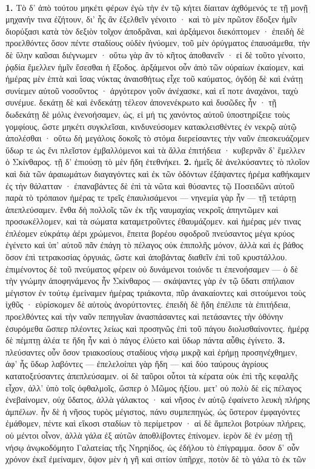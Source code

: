 \documentclass[a4paper, 11pt, oneside, polutonikogreek, german]{article}
\begin{document}
\paragraph{}
\textbf{1.} Τὸ δ' ἀπὸ τούτου μηκέτι φέρων ἐγὼ τὴν ἐν τῷ κήτει δίαιταν ἀχθόμενός τε τῇ μονῇ μηχανήν τινα ἐζήτουν, δι' ἧς ἂν ἐξελθεῖν γένοιτο · καὶ τὸ μὲν πρῶτον ἔδοξεν ἡμῖν διορύξασι κατὰ τὸν δεξιὸν τοῖχον ἀποδρᾶναι, καὶ ἀρξάμενοι διεκόπτομεν · ἐπειδὴ δὲ προελθόντες ὅσον πέντε σταδίους οὐδὲν ἠνύομεν, τοῦ μὲν ὀρύγματος ἐπαυσάμεθα, τὴν δὲ ὕλην καῦσαι διέγνωμεν · οὕτω γὰρ ἂν τὸ κῆτος ἀποθανεῖν · εἰ δὲ τοῦτο γένοιτο, ῥᾳδία ἔμελλεν ἡμῖν ἔσεσθαι ἡ ἔξοδος. ἀρξάμενοι οὖν ἀπὸ τῶν οὐραίων ἐκαίομεν, καὶ ἡμέρας μὲν ἑπτὰ καὶ ἴσας νύκτας ἀναισθήτως εἶχε τοῦ καύματος, ὀγδόῃ δὲ καὶ ἐνάτῃ συνίεμεν αὐτοῦ νοσοῦντος · ἀργότερον γοῦν ἀνέχασκε, καὶ εἴ ποτε ἀναχάνοι, ταχὺ συνέμυε. δεκάτῃ δὲ καὶ ἑνδεκάτῃ τέλεον ἀπονενέκρωτο καὶ δυσῶδες ἦν · τῇ δωδεκάτῃ δὲ μόλις ἐνενοήσαμεν, ὡς, εἰ μή τις χανόντος αὐτοῦ ὑποστηρίξειε τοὺς γομφίους, ὥστε μηκέτι συγκλεῖσαι, κινδυνεύσομεν κατακλεισθέντες ἐν νεκρῷ αὐτῷ ἀπολέσθαι · οὕτω δὴ μεγάλοις δοκοῖς τὸ στόμα διερείσαντες τὴν ναῦν ἐπεσκευάζομεν ὕδωρ τε ὡς ἔνι πλεῖστον ἐμβαλλόμενοι καὶ τὰ ἄλλα ἐπιτήδεια · κυβερνᾶν δ' ἔμελλεν ὁ Σκίνθαρος. τῇ δ' ἐπιούσῃ τὸ μὲν ἤδη ἐτεθνήκει. \textbf{2.} ἡμεῖς δὲ ἀνελκύσαντες τὸ πλοῖον καὶ διὰ τῶν ἀραιωμάτων διαγαγόντες καὶ ἐκ τῶν ὀδόντων ἐξάψαντες ἠρέμα καθήκαμεν ἐς τὴν θάλατταν · ἐπαναβάντες δὲ ἐπὶ τὰ νῶτα καὶ θύσαντες τῷ Ποσειδῶνι αὐτοῦ παρὰ τὸ τρόπαιον ἡμέρας τε τρεῖς ἐπαυλισάμενοι --- νηνεμία γὰρ ἦν --- τῇ τετάρτῃ ἀπεπλεύσαμεν. ἔνθα δὴ πολλοῖς τῶν ἐκ τῆς ναυμαχίας νεκροῖς ἀπηντῶμεν καὶ προσωκέλλομεν, καὶ τὰ σώματα καταμετροῦντες ἐθαυμάζομεν. καὶ ἡμέρας μέν τινας ἐπλέομεν εὐκράτῳ ἀέρι χρώμενοι, ἔπειτα βορέου σφοδροῦ πνεύσαντος μέγα κρύος ἐγένετο καὶ ὑπ' αὐτοῦ πᾶν ἐπάγη τὸ πέλαγος οὐκ ἐπιπολῆς μόνον, ἀλλὰ καὶ ἐς βάθος ὅσον ἐπὶ τετρακοσίας ὀργυιάς, ὥστε καὶ ἀποβάντας διαθεῖν ἐπὶ τοῦ κρυστάλλου. ἐπιμένοντος δὲ τοῦ πνεύματος φέρειν οὐ δυνάμενοι τοιόνδε τι ἐπενοήσαμεν --- ὁ δὲ τὴν γνώμην ἀποφηνάμενος ἦν Σκίνθαρος --- σκάψαντες γὰρ ἐν τῷ ὕδατι σπήλαιον μέγιστον ἐν τούτῳ ἐμείναμεν ἡμέρας τριάκοντα, πῦρ ἀνακαίοντες καὶ σιτούμενοι τοὺς ἰχθῦς · εὑρίσκομεν δὲ αὐτοὺς ἀνορύττοντες. ἐπειδὴ δὲ ἤδη ἐπέλιπε τὰ ἐπιτήδεια, προελθόντες καὶ τὴν ναῦν πεπηγυῖαν ἀνασπάσαντες καὶ πετάσαντες τὴν ὀθόνην ἐσυρόμεθα ὥσπερ πλέοντες λείως καὶ προσηνῶς ἐπὶ τοῦ πάγου διολισθαίνοντες. ἡμέρᾳ δὲ πέμπτῃ ἀλέα τε ἤδη ἦν καὶ ὁ πάγος ἐλύετο καὶ ὕδωρ πάντα αὖθις ἐγίνετο. \textbf{3.} πλεύσαντες οὖν ὅσον τριακοσίους σταδίους νήσῳ μικρᾷ καὶ ἐρήμῃ προσηνέχθημεν, ἀφ' ἧς ὕδωρ λαβόντες --- ἐπελελοίπει γὰρ ἤδη --- καὶ δύο ταύρους ἀγρίους κατατοξεύσαντες ἀπεπλεύσαμεν. οἱ δὲ ταῦροι οὗτοι τὰ κέρατα οὐκ ἐπὶ τῆς κεφαλῆς εἶχον, ἀλλ' ὑπὸ τοῖς ὀφθαλμοῖς, ὥσπερ ὁ Μῶμος ἠξίου. μετ' οὐ πολὺ δὲ εἰς πέλαγος ἐνεβαίνομεν, οὐχ ὕδατος, ἀλλὰ γάλακτος · καὶ νῆσος ἐν αὐτῷ ἐφαίνετο λευκὴ πλήρης ἀμπέλων. ἦν δὲ ἡ νῆσος τυρὸς μέγιστος, πάνυ συμπεπηγώς, ὡς ὕστερον ἐμφαγόντες ἐμάθομεν, πέντε καὶ εἴκοσι σταδίων τὸ περίμετρον · αἱ δὲ ἄμπελοι βοτρύων πλήρεις, οὐ μέντοι οἶνον, ἀλλὰ γάλα ἐξ αὐτῶν ἀποθλίβοντες ἐπίνομεν. ἱερὸν δὲ ἐν μέσῃ τῇ νήσῳ ἀνῳκοδόμητο Γαλατείας τῆς Νηρηίδος, ὡς ἐδήλου τὸ ἐπίγραμμα. ὅσον δ' οὖν χρόνον ἐκεῖ ἐμείναμεν, ὄψον μὲν ἡ γῆ καὶ σιτίον ὑπῆρχε, ποτὸν δὲ τὸ γάλα τὸ ἐκ τῶν 
\end{document}
